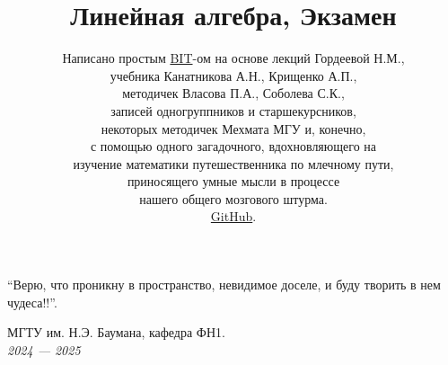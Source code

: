 \documentclass[a4papper]{article}
\title{\Huge Линейная алгебра, Экзамен}
\author{
    Написано простым \href{https://t.me/Borislav_Timoshin}{BIT}-ом на основе лекций Гордеевой Н.М., \\ 
    учебника Канатникова А.Н., Крищенко А.П., \\
    методичек Власова П.А., Соболева С.К., \\
    записей одногруппников и старшекурсников,\\ некоторых методичек Мехмата МГУ и, конечно, \\ с помощью одного загадочного, вдохновляющего на \\ изучение математики путешественника по млечному пути, \\
    приносящего умные мысли в процессе \\
    нашего общего мозгового штурма. \\
    \href{https://github.com/BorislavTimoshin/Linear-Algebra-BMSTU-BS1-Exam-}{GitHub}.
}
\date{} %
\begin{document}
    \pagestyle{fancy}
    \fancyhead[L]{\thepage}

    \maketitle

    \epigraph{
        ``Верю, что проникну в пространство, невидимое доселе, и буду творить в нем чудеса!!''.
    }{}


    \vfill %

    \begin{center}
        \Large МГТУ им. Н.Э. Баумана, кафедра ФН1. \\
        \emph{2024 — 2025}
    \end{center}

    \newpage
        
    \tableofcontents


    
    
\end{document}

